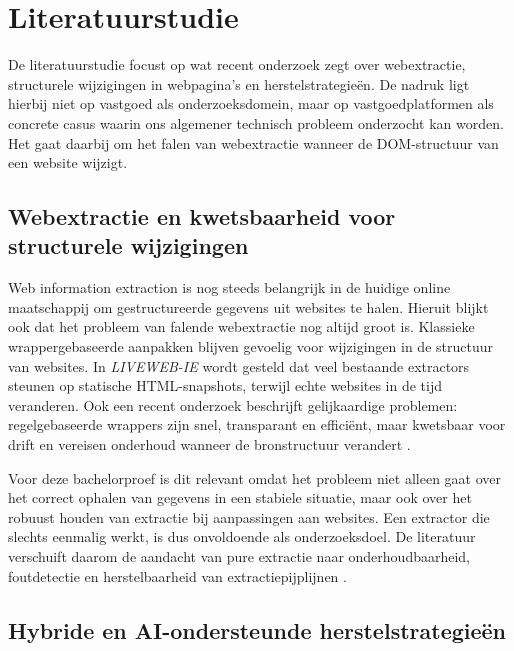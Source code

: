 \section{Literatuurstudie}
\label{sec:literatuurstudie}

De literatuurstudie focust op wat recent onderzoek zegt over webextractie, structurele wijzigingen in webpagina’s en herstelstrategieën. De nadruk ligt hierbij niet op vastgoed als onderzoeksdomein, maar op vastgoedplatformen als concrete casus waarin ons algemener technisch probleem onderzocht kan worden. Het gaat daarbij om het falen van webextractie wanneer de DOM-structuur van een website wijzigt.

\subsection{Webextractie en kwetsbaarheid voor structurele wijzigingen}
\label{subsec:lit-webextractie}

Web information extraction is nog steeds belangrijk in de huidige online maatschappij om gestructureerde gegevens uit websites te halen. Hieruit blijkt ook dat het probleem van falende webextractie nog altijd groot is. Klassieke wrappergebaseerde aanpakken blijven gevoelig voor wijzigingen in de structuur van websites. In \textit{LIVEWEB-IE} wordt gesteld dat veel bestaande extractors steunen op statische HTML-snapshots, terwijl echte websites in de tijd veranderen. Ook een recent onderzoek beschrijft gelijkaardige problemen: regelgebaseerde wrappers zijn snel, transparant en efficiënt, maar kwetsbaar voor drift en vereisen onderhoud wanneer de bronstructuur verandert \autocite{yang2026livewebie, marineli2025controlplanes}.

Voor deze bachelorproef is dit relevant omdat het probleem niet alleen gaat over het correct ophalen van gegevens in een stabiele situatie, maar ook over het robuust houden van extractie bij aanpassingen aan websites. Een extractor die slechts eenmalig werkt, is dus onvoldoende als onderzoeksdoel. De literatuur verschuift daarom de aandacht van pure extractie naar onderhoudbaarheid, foutdetectie en herstelbaarheid van extractiepijplijnen \autocite{yang2026livewebie, marineli2025controlplanes}.

\subsection{Hybride en AI-ondersteunde herstelstrategieën}
\label{subsec:lit-hybride-ai}

